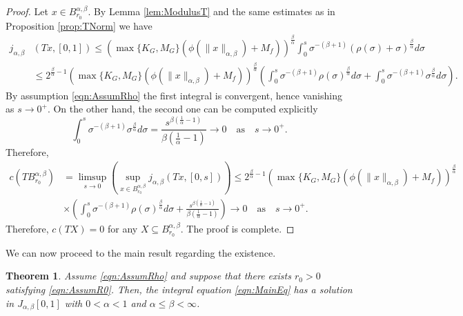 \documentclass[12pt,a4paper]{article}
\newtheorem{thm}{Theorem}
\begin{document}
\begin{proof}
	Let $x\in B_{r_0}^{\alpha,\beta}$. By Lemma \ref{lem:ModulusT} and the same estimates as in Proposition \ref{prop:TNorm} we have 
	\begin{equation}
		\begin{split}
			j_{\alpha,\beta}&(Tx, [0,1]) 
			\leq \left(\max\{K_G , M_G\}\left(\phi(\|x\|_{\alpha,\beta}) + M_f\right)\right)^\frac{\beta}{\alpha} \int_0^s \sigma^{-(\beta+1)} \left(\rho(\sigma) + \sigma \right)^\frac{\beta}{\alpha} d\sigma \\
			&\leq 2^{\frac{\beta}{\alpha}-1}\left(\max\{K_G , M_G\}\left(\phi(\|x\|_{\alpha,\beta}) + M_f\right)\right)^\frac{\beta}{\alpha}\left(\int_0^s \sigma^{-(\beta+1)} \rho(\sigma)^\frac{\beta}{\alpha}d\sigma + \int_0^s\sigma^{-(\beta+1)}\sigma^\frac{\beta}{\alpha} d\sigma\right).
		\end{split}
	\end{equation}
	By assumption \eqref{eqn:AssumRho} the first integral is convergent, hence vanishing as $s\rightarrow 0^+$. On the other hand, the second one can be computed explicitly
	\begin{equation}
		\int_0^s\sigma^{-(\beta+1)}\sigma^\frac{\beta}{\alpha} d\sigma = \frac{s^{\beta\left(\frac{1}{\alpha}-1\right)}}{\beta\left(\frac{1}{\alpha}-1\right)} \rightarrow 0 \quad \text{as} \quad s\rightarrow 0^+.
	\end{equation}
	Therefore,
	\begin{equation}
		\begin{split}
			c(T B_{r_0}^{\alpha,\beta}) 
			&= \limsup\limits_{s\rightarrow 0}\left(\sup_{x\in B_{r_0}^{\alpha,\beta}} j_{\alpha,\beta}(Tx, [0,s])\right) \leq 2^{\frac{\beta}{\alpha}-1}\left(\max\{K_G, M_G\}\left(\phi(\|x\|_{\alpha,\beta}) + M_f\right)\right)^\frac{\beta}{\alpha} \\
			&\times\left(\int_0^s \sigma^{-(\beta+1)} \rho(\sigma)^\frac{\beta}{\alpha}d\sigma + \frac{s^{\beta\left(\frac{1}{\alpha}-1\right)}}{\beta\left(\frac{1}{\alpha}-1\right)}\right) \rightarrow 0 \quad \text{as} \quad s\rightarrow 0^+.
		\end{split}
	\end{equation}
	Therefore, $c(TX) = 0$ for any $X \subseteq B_{r_0}^{\alpha,\beta}$. The proof is complete. 
\end{proof}
We can now proceed to the main result regarding the existence.
\begin{thm}\label{thm:Existence}
	Assume \eqref{eqn:AssumRho} and suppose that there exists $r_0>0$ satisfying \eqref{eqn:AssumR0}. Then, the integral equation \eqref{eqn:MainEq} has a solution in $J_{\alpha,\beta}[0,1]$ with $0<\alpha<1$ and $\alpha\leq \beta<\infty$. 
\end{thm}
\end{document}
